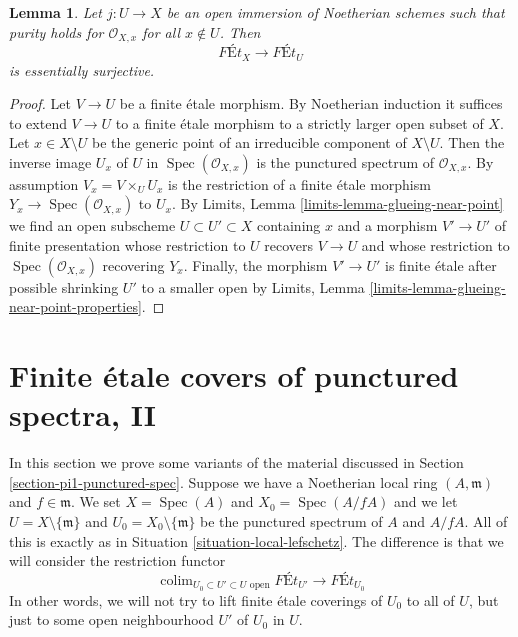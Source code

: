 \documentclass{stacks-project}
\theoremstyle{plain}
\newtheorem{lemma}[subsection]{Lemma}
\theoremstyle{definition}
\theoremstyle{remark}
\numberwithin{equation}{subsection}
\def\colim{\mathop{\mathrm{colim}}\nolimits}
\def\Spec{\mathop{\mathrm{Spec}}}
\begin{document}
\begin{lemma}
\label{lemma-extend-pure}
Let $j : U \to X$ be an open immersion of Noetherian schemes
such that purity holds for $\mathcal{O}_{X, x}$ for all $x \not \in U$.
Then
$$
\textit{F\'Et}_X \longrightarrow \textit{F\'Et}_U
$$
is essentially surjective.
\end{lemma}

\begin{proof}
Let $V \to U$ be a finite \'etale morphism. By Noetherian
induction it suffices to extend $V \to U$ to a finite \'etale
morphism to a strictly larger open subset of $X$.
Let $x \in X \setminus U$ be the generic point of
an irreducible component of $X \setminus U$.
Then the inverse image $U_x$ of $U$ in $\Spec(\mathcal{O}_{X, x})$
is the punctured spectrum of $\mathcal{O}_{X, x}$.
By assumption $V_x = V \times_U U_x$ is the restriction
of a finite \'etale morphism $Y_x \to \Spec(\mathcal{O}_{X, x})$
to $U_x$.
By Limits, Lemma \ref{limits-lemma-glueing-near-point}
we find an open subscheme $U \subset U' \subset X$
containing $x$ and a morphism $V' \to U'$ of finite presentation
whose restriction to $U$ recovers $V \to U$ and
whose restriction to $\Spec(\mathcal{O}_{X, x})$ recovering $Y_x$.
Finally, the morphism $V' \to U'$ is finite \'etale
after possible shrinking $U'$ to a smaller open by
Limits, Lemma \ref{limits-lemma-glueing-near-point-properties}.
\end{proof}
















\section{Finite \'etale covers of punctured spectra, II}
\label{section-pi1-punctured-spec-II}

\noindent
In this section we prove some variants of the material discussed
in Section \ref{section-pi1-punctured-spec}. Suppose
we have a Noetherian local ring $(A, \mathfrak m)$ and $f \in \mathfrak m$.
We set $X = \Spec(A)$ and $X_0 = \Spec(A/fA)$ and we
let $U = X \setminus \{\mathfrak m\}$ and
$U_0 = X_0 \setminus \{\mathfrak m\}$ be the punctured spectrum of
$A$ and $A/fA$. All of this is exactly as in
Situation \ref{situation-local-lefschetz}.
The difference is that we will consider the restriction functor
$$
\colim_{U_0 \subset U' \subset U\text{ open}} \textit{F\'Et}_{U'}
\longrightarrow
\textit{F\'Et}_{U_0}
$$
In other words, we will not try to lift finite \'etale coverings
of $U_0$ to all of $U$, but just to some open neighbourhood
$U'$ of $U_0$ in $U$.
\end{document}

